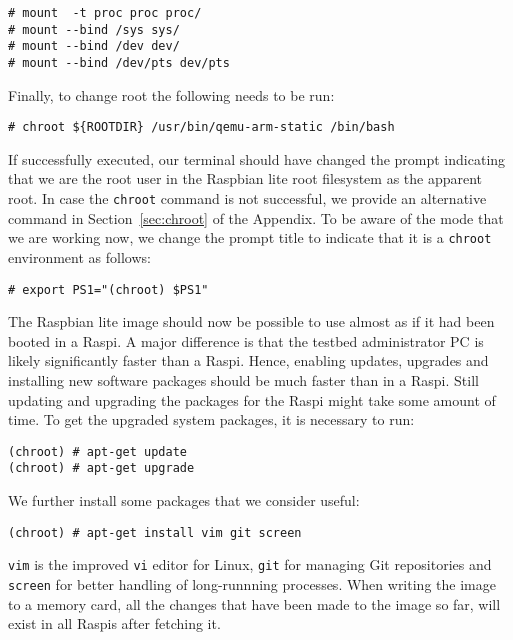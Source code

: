 \begin{lstlisting}[]
# mount  -t proc proc proc/
# mount --bind /sys sys/
# mount --bind /dev dev/
# mount --bind /dev/pts dev/pts
\end{lstlisting}
\FloatBarrier
\vspace{-5mm}

Finally, to change root the following needs to be run:

\begin{lstlisting}[]
# chroot ${ROOTDIR} /usr/bin/qemu-arm-static /bin/bash
\end{lstlisting}
\FloatBarrier
\vspace{-5mm}

If successfully executed, our terminal should have changed the prompt
indicating that we are the root user in the Raspbian lite root filesystem as
the apparent root. In case the \texttt{chroot} command is not successful,
we provide an alternative command in Section~\ref{sec:chroot} of the Appendix.
To be aware of the mode that we are working now, we change
the prompt title to indicate that it is a \texttt{chroot} environment as
follows:

\begin{lstlisting}[]
# export PS1="(chroot) $PS1"
\end{lstlisting}
\FloatBarrier
\vspace{-5mm}

The Raspbian lite image should now be possible to use almost as if it had
been booted in a \ac{Raspi}. A major difference is that the testbed
administrator \ac{PC} is likely significantly faster than a \ac{Raspi}.
Hence, enabling updates, upgrades and installing new software packages
should be much faster than in a \ac{Raspi}. Still updating and upgrading
the packages for the \ac{Raspi} might take some amount of time. To get
the upgraded system packages, it is necessary to run:

\begin{lstlisting}[]
(chroot) # apt-get update
(chroot) # apt-get upgrade
\end{lstlisting}
\FloatBarrier
\vspace{-5mm}

We further install some packages that we consider useful:
\begin{lstlisting}[]
(chroot) # apt-get install vim git screen
\end{lstlisting}
\FloatBarrier
\vspace{-5mm}

\texttt{vim} is the improved \texttt{vi} editor for Linux, \texttt{git}
for managing Git repositories and \texttt{screen} for better handling of
long-runnning processes. When writing the image to a memory card, all the
changes that have been made to the image so far, will exist in all
\ac{Raspi}s after fetching it.